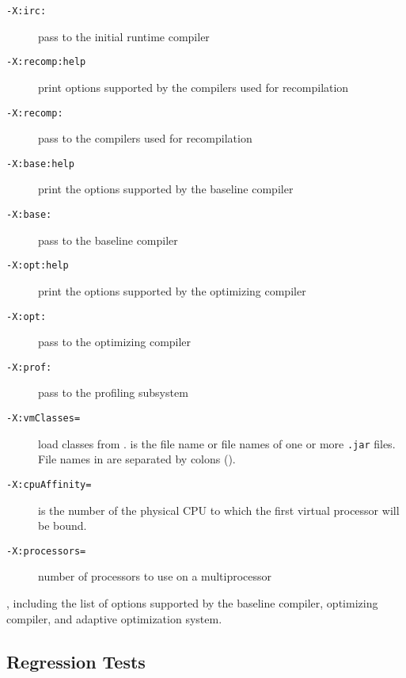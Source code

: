 \begin{description}
\item[{\tt -X:irc:}]
pass  to the initial runtime compiler

\item[{\tt -X:recomp\Mlsq{}:help\Mrsq{}}]
print options supported by the compilers used for recompilation

\item[{\tt -X:recomp:}]
pass  to the compilers used for recompilation

\item[{\tt -X:base\Mlsq{}:help\Mrsq{}}]
print the options supported by the baseline compiler

\item[{\tt -X:base:}]
pass  to the baseline compiler

\item[{\tt -X:opt\Mlsq{}:help\Mrsq{}}]
print the options supported by the optimizing compiler

\item[{\tt -X:opt:}]
pass  to the optimizing compiler

\item[{\tt -X:prof:}]
pass  to the profiling subsystem

\item[{\tt -X:vmClasses=}]
load classes from .   is the file name or
file names of one or more {\tt .jar} files.  File names in
 are separated by colons (\Mlitch{:}).

\item[{\tt -X:cpuAffinity=}]
 is the number of the physical CPU to which the first virtual processor will be bound.

\item[{\tt -X:processors=\Mlsq{}  \Mor{}  \Mrsq{}}]
number of processors to use on a multiprocessor

\end{description}

, including the list of options supported by the baseline
compiler, optimizing compiler, and adaptive optimization system. 

\subsection{Regression Tests}
\label{sec:regression}


